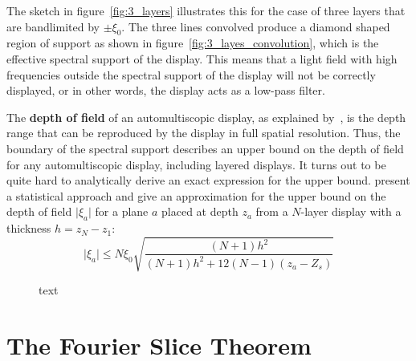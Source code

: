 The sketch in figure~\ref{fig:3_layers} illustrates this for the case of three layers that are bandlimited by $\pm \xi_0$.
The three lines convolved produce a diamond shaped region of support as shown in figure~\ref{fig:3_layes_convolution}, which is the effective spectral support of the display.
This means that a light field with high frequencies outside the spectral support of the display will not be correctly displayed, or in other words, the display acts as a low-pass filter.

The \textbf{depth of field} of an automultiscopic display, as explained by~\cite{Antialiasingfor3DDisplays}, is the depth range that can be reproduced by the display in full spatial resolution.
Thus, the boundary of the spectral support describes an upper bound on the depth of field for any automultiscopic display, including layered displays.
It turns out to be quite hard to analytically derive an exact expression for the upper bound.
\cite{WetzsteinTomo} present a statistical approach and give an approximation for the upper bound on the depth of field $\lvert \xi_a \rvert$ for a plane $a$ placed at depth $z_a$ from a \mbox{$N$-layer} display with a thickness $h = z_N - z_1$:
\begin{equation}
	\lvert \xi_a \rvert \leq N \xi_0 \sqrt{ \frac{(N + 1) h^2}{(N + 1) h^2 + 12(N - 1)(z_a - Z_s)} }
\end{equation}

\begin{figure}[tb]
	\hfill%
	\hfill%
	\caption{text}
\end{figure}


\section{The Fourier Slice Theorem}

